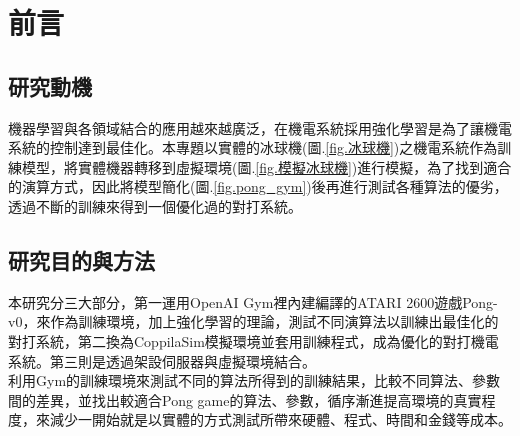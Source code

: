 \chapter{前言}
\renewcommand{\baselinestretch}{10.0} %
\setcounter{page}{1}  %
\fontsize{14pt}{2.5pt}\sectionef
\section{研究動機}
機器學習與各領域結合的應用越來越廣泛，在機電系統採用強化學習是為了讓機電系統的控制達到最佳化。本專題以實體的冰球機(圖.\ref{fig.冰球機})之機電系統作為訓練模型，將實體機器轉移到虛擬環境(圖.\ref{fig.模擬冰球機})進行模擬，為了找到適合的演算方式，因此將模型簡化(圖.\ref{fig.pong_gym})後再進行測試各種算法的優劣，透過不斷的訓練來得到一個優化過的對打系統。\\

\begin{figure}[hbt!]
\begin{center}
\end{center}
\end{figure}
\section{研究目的與方法}
 本研究分三大部分，第一運用OpenAI Gym裡內建編譯的ATARI 2600遊戲Pong-v0，來作為訓練環境，加上強化學習的理論，測試不同演算法以訓練出最佳化的對打系統，第二換為CoppilaSim模擬環境並套用訓練程式，成為優化的對打機電系統。第三則是透過架設伺服器與虛擬環境結合。\\
 
 利用Gym的訓練環境來測試不同的算法所得到的訓練結果，比較不同算法、參數間的差異，並找出較適合Pong game的算法、參數，循序漸進提高環境的真實程度，來減少一開始就是以實體的方式測試所帶來硬體、程式、時間和金錢等成本。\\

